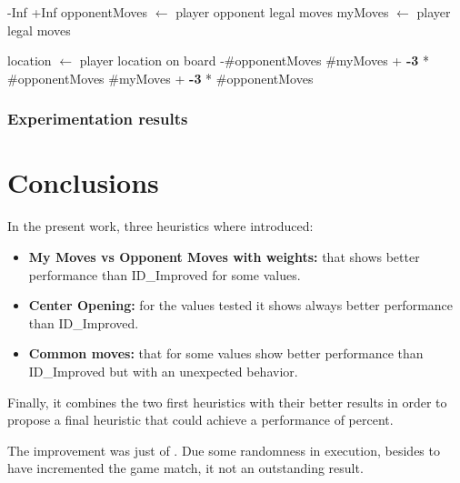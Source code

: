 \documentclass[10pt, a4paper,english]{article}
\begin{document}
\begin{algorithmic}
    \State\Return -Inf
\EndIf    
{}
   \State \Return +Inf
\Else
    \State opponentMoves $\leftarrow$ player opponent legal moves
  	\State myMoves $\leftarrow$ player legal moves
    
		\State location $\leftarrow$ player location on board
        	\State{}-\#opponentMoves
        \Else
        	\State\Return \#myMoves + \textbf{-3} * \#opponentMoves
        \EndIf
    \Else
    	\State\Return \#myMoves + \textbf{-3} * \#opponentMoves
	\EndIf
\EndIf
\EndFunction
\end{algorithmic}

\subsubsection{Experimentation results}


\section{Conclusions}

In the present work, three heuristics where introduced:

\begin{itemize}
\item \textbf{My Moves vs Opponent Moves with weights:} that shows better performance than ID\_Improved for some values. 
\item \textbf{Center Opening:} for the values tested it shows always better performance than ID\_Improved.
\item \textbf{Common moves:} that for some values show better performance than ID\_Improved but with an unexpected behavior.
\end{itemize}

Finally, it combines the two first heuristics with their better results in order to propose a final heuristic that could achieve a performance of percent.

The improvement was just of . Due some randomness in execution, besides to have incremented the game match, it not an outstanding result.

\end{document}
